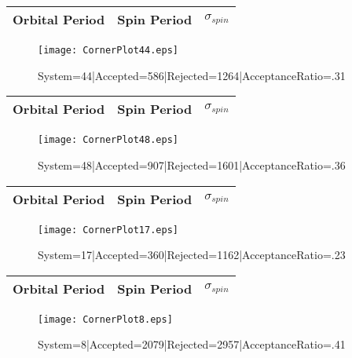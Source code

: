 \documentclass[10pt]{article}
\begin{document}
\begin{center}
        \begin{tabular}{|c|c|c|}
        \hline
Orbital Period & Spin Period & $\sigma_{spin}$ \\
 \hline
        \end{tabular}
        \end{center}
\begin{figure}[h] 
        \texttt{[image: CornerPlot44.eps]}
        \caption{System=44|Accepted=586|Rejected=1264|AcceptanceRatio=.31}
        \label{S44}
        \centering
        \end{figure}
\begin{center}
        \begin{tabular}{|c|c|c|}
        \hline
Orbital Period & Spin Period & $\sigma_{spin}$ \\
 \hline
        \end{tabular}
        \end{center}
\begin{figure}[h] 
        \texttt{[image: CornerPlot48.eps]}
        \caption{System=48|Accepted=907|Rejected=1601|AcceptanceRatio=.36}
        \label{S48}
        \centering
        \end{figure}
\begin{center}
        \begin{tabular}{|c|c|c|}
        \hline
Orbital Period & Spin Period & $\sigma_{spin}$ \\
 \hline
        \end{tabular}
        \end{center}
\begin{figure}[h] 
        \texttt{[image: CornerPlot17.eps]}
        \caption{System=17|Accepted=360|Rejected=1162|AcceptanceRatio=.23}
        \label{S17}
        \centering
        \end{figure}
\begin{center}
        \begin{tabular}{|c|c|c|}
        \hline
Orbital Period & Spin Period & $\sigma_{spin}$ \\
 \hline
        \end{tabular}
        \end{center}
\begin{figure}[h] 
        \texttt{[image: CornerPlot8.eps]}
        \caption{System=8|Accepted=2079|Rejected=2957|AcceptanceRatio=.41}
        \label{S8}
        \centering
        \end{figure}
\end{document}
